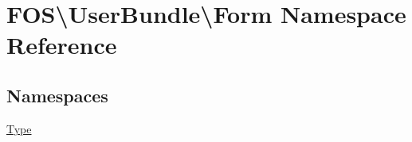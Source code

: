 \hypertarget{namespace_f_o_s_1_1_user_bundle_1_1_form}{\section{F\+O\+S\textbackslash{}User\+Bundle\textbackslash{}Form Namespace Reference}
\label{namespace_f_o_s_1_1_user_bundle_1_1_form}
}
\subsection*{Namespaces}
\begin{DoxyCompactItemize}
\item 
 \hyperlink{namespace_f_o_s_1_1_user_bundle_1_1_form_1_1_type}{Type}
\end{DoxyCompactItemize}
